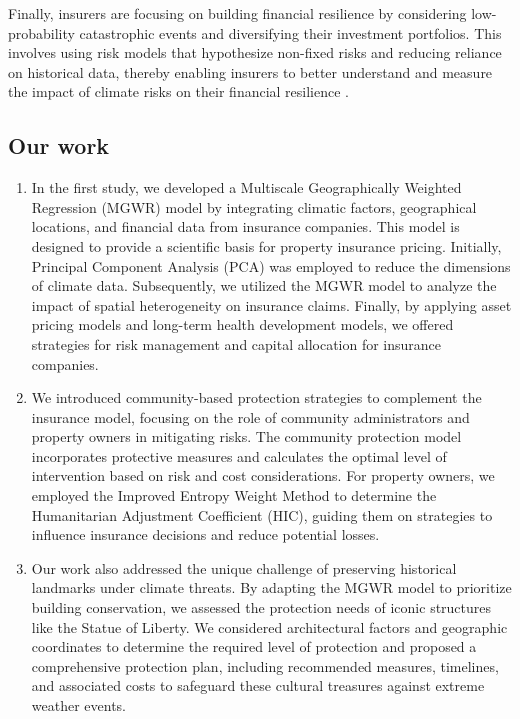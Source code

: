 \documentclass[12pt]{article}
\begin{document}
Finally, insurers are focusing on building financial resilience by considering low-probability catastrophic events and diversifying their investment portfolios. This involves using risk models that hypothesize non-fixed risks and reducing reliance on historical data, thereby enabling insurers to better understand and measure the impact of climate risks on their financial resilience \cite{sheehan2023benefits}.

\subsection{Our work}
\begin{enumerate}[\bf 1.]
	\item In the first study, we developed a Multiscale Geographically Weighted Regression (MGWR) model by integrating climatic factors, geographical locations, and financial data from insurance companies. This model is designed to provide a scientific basis for property insurance pricing. Initially, Principal Component Analysis (PCA) was employed to reduce the dimensions of climate data. Subsequently, we utilized the MGWR model to analyze the impact of spatial heterogeneity on insurance claims. Finally, by applying asset pricing models and long-term health development models, we offered strategies for risk management and capital allocation for insurance companies.
	\item We introduced community-based protection strategies to complement the insurance model, focusing on the role of community administrators and property owners in mitigating risks. The community protection model incorporates protective measures and calculates the optimal level of intervention based on risk and cost considerations. For property owners, we employed the Improved Entropy Weight Method to determine the Humanitarian Adjustment Coefficient (HIC), guiding them on strategies to influence insurance decisions and reduce potential losses.
	\item Our work also addressed the unique challenge of preserving historical landmarks under climate threats. By adapting the MGWR model to prioritize building conservation, we assessed the protection needs of iconic structures like the Statue of Liberty. We considered architectural factors and geographic coordinates to determine the required level of protection and proposed a comprehensive protection plan, including recommended measures, timelines, and associated costs to safeguard these cultural treasures against extreme weather events.
\end{enumerate}
\end{document}
